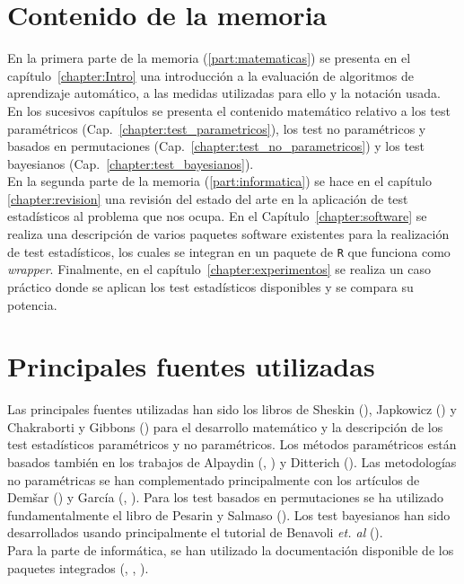 \section*{Contenido de la memoria}
	En la primera parte de la memoria
(\ref{part:matematicas}) se presenta en el 
capítulo~\ref{chapter:Intro} una introducción a la evaluación 
de algoritmos de aprendizaje automático, a las medidas 
utilizadas para ello y la notación usada. En los 
sucesivos capítulos se presenta el contenido matemático
relativo a los test paramétricos 
(Cap.~\ref{chapter:test_parametricos}), los test no
paramétricos y basados en permutaciones 
(Cap.~\ref{chapter:test_no_parametricos}) y
los test bayesianos (Cap.~\ref{chapter:test_bayesianos}).\\
	En la segunda parte de la memoria 
(\ref{part:informatica}) se hace en el capítulo~
\ref{chapter:revision} una revisión del estado del arte
en la aplicación de test estadísticos al problema que 
nos ocupa. En el Capítulo~\ref{chapter:software} se
realiza una descripción de varios paquetes software 
existentes para la realización de test estadísticos, los
cuales se integran en un paquete de \texttt{R} que funciona
como \textit{wrapper}. Finalmente,
en el capítulo~\ref{chapter:experimentos} se realiza un
caso práctico donde se aplican los test estadísticos
disponibles y se compara su potencia.

\section*{Principales fuentes utilizadas}

	Las principales fuentes utilizadas han sido los libros de
Sheskin
(\cite{sheskin2003handbook}), Japkowicz
(\cite{DBLP:books/cu/Japkowicz2011})
y Chakraborti y Gibbons (\cite{DBLP:reference/stat/GibbonsC11}) 
para el desarrollo matemático
y la descripción de los test estadísticos paramétricos y
no paramétricos. Los métodos paramétricos están basados 
también en los trabajos de Alpaydin (\cite{Alpaydin98combined5},
\cite{Alpaydin:2010:IML:1734076}) y Ditterich
 (\cite{dietterich1998approximate}).
Las metodologías no paramétricas se
han complementado principalmente con los artículos de 
Dem\v{s}ar (\cite{DBLP:journals/jmlr/Demsar06}) y 
García (\cite{garcia2008extension}, 
\cite{DBLP:journals/isci/GarciaFLH10}). Para los test basados
en permutaciones se ha utilizado fundamentalmente el 
libro de Pesarin y Salmaso (\cite{pesarin2010permutation}).
Los test bayesianos han sido desarrollados usando 
principalmente el tutorial de Benavoli \textit{et. al} 
(\cite{DBLP:journals/corr/BenavoliCDZ16}).\\
	Para la parte de informática, se han utilizado la
documentación disponible de los paquetes integrados
(\cite{2015arXiv150104222D}, \cite{scmamp}, 
\cite{DBLP:conf/icml/BenavoliCMZ15}).

